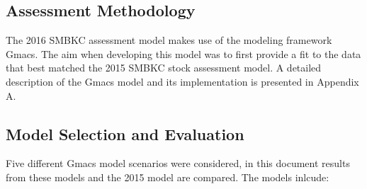 \documentclass[]{article}
\begin{document}
\subsection{Assessment Methodology}\label{assessment-methodology}

The 2016 SMBKC assessment model makes use of the modeling framework
Gmacs. The aim when developing this model was to first provide a fit to
the data that best matched the 2015 SMBKC stock assessment model. A
detailed description of the Gmacs model and its implementation is
presented in Appendix A.

\subsection{Model Selection and
Evaluation}\label{model-selection-and-evaluation}

Five different Gmacs model scenarios were considered, in this document
results from these models and the 2015 model are compared. The models
inlcude:
\end{document}
